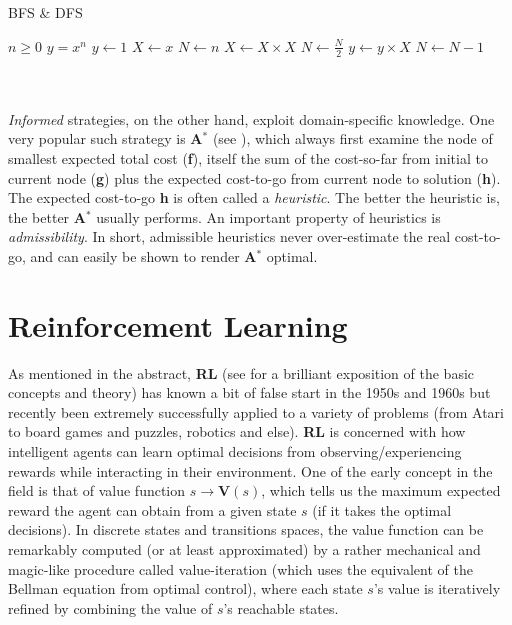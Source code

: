 \\
\\
\begin{algorithm}
\caption{BFS \& DFS}\label{alg:bfsdfs}
\begin{algorithmic}
\Require $n \geq 0$
\Ensure $y = x^n$
\State $y \gets 1$
\State $X \gets x$
\State $N \gets n$
    \State $X \gets X \times X$
    \State $N \gets \frac{N}{2}$  
    \State $y \gets y \times X$
    \State $N \gets N - 1$
\EndIf
\EndWhile
\end{algorithmic}
\end{algorithm}
\\
\\
\textit{Informed} strategies, on the other hand, exploit domain-specific knowledge. One very popular such strategy is \textbf{A$^{*}$} (see \cite{DBLP:journals/jacm/DechterP85}), which always first examine the node of smallest expected total cost (\textbf{f}), itself the sum of the cost-so-far from initial to current node (\textbf{g}) plus the expected cost-to-go from current node to solution (\textbf{h}). The expected cost-to-go \textbf{h} is often called a \textit{heuristic}. The better the heuristic is, the better \textbf{A$^{*}$} usually performs. An important property of heuristics is \textit{admissibility}. In short, admissible heuristics never over-estimate the real cost-to-go, and can easily be shown to render \textbf{A$^{*}$} optimal.




\section{Reinforcement Learning}

As mentioned in the abstract, \textbf{RL} (see \cite{Sutton1998} for a brilliant exposition of the basic concepts and theory) has known a bit of false start in the 1950s and 1960s but recently been extremely successfully applied to a variety of problems (from Atari to board games and puzzles, robotics and else). \textbf{RL} is concerned with how intelligent agents can learn optimal decisions from observing/experiencing rewards while interacting in their environment. One of the early concept in the field is that of value function $s \to \textbf{V}(s)$, which tells us the maximum expected reward the agent can obtain from a given state $s$ (if it takes the optimal decisions). In discrete states and transitions spaces, the value function can be remarkably computed (or at least approximated) by a rather mechanical and magic-like procedure called value-iteration (which uses the equivalent of the Bellman equation from optimal control), where each state $s$'s value is iteratively refined by combining the value of $s$'s reachable states.



